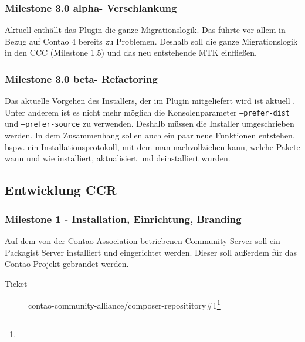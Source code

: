 \documentclass[
paper=a4,
draft=false,%
fontsize=10pt%
]{scrartcl}
\begin{document}
\subsubsection[Milestone 3.0 alpha - Verschlankung]{Milestone 3.0 alpha\footnotemark - Verschlankung}
\label{subsec:ccp-milestone-3.0-alpha}

Aktuell enthällt das Plugin die ganze Migrationslogik. Das führte vor allem in Bezug auf Contao 4 bereits zu Problemen. Deshalb soll die ganze Migrationslogik in den CCC (Milestone 1.5) und das neu entstehende MTK einfließen.

\subsubsection[Milestone 3.0 beta - Refactoring]{Milestone 3.0 beta\footnotemark - Refactoring}
\label{subsec:ccp-milestone-3.0-beta}

Das aktuelle Vorgehen des Installers, der im Plugin mitgeliefert wird ist aktuell . Unter anderem ist es nicht mehr möglich die Konsolenparameter \texttt{--prefer-dist} und \texttt{--prefer-source} zu verwenden. Deshalb müssen die Installer umgeschrieben werden. In dem Zusammenhang sollen auch ein paar neue Funktionen entstehen, bspw. ein Installationsprotokoll, mit dem man nachvollziehen kann, welche Pakete wann und wie installiert, aktualisiert und deinstalliert wurden.

\pagebreak

\subsection{Entwicklung CCR}
\label{subsec:ccr}

\subsubsection{Milestone 1 - Installation, Einrichtung, Branding}
\label{subsec:ccr-milestone-1}

Auf dem von der Contao Association betriebenen Community Server soll ein Packagist Server installiert und eingerichtet werden. Dieser soll außerdem für das Contao Projekt gebrandet werden.

\begin{description}
\item[Ticket] contao-community-alliance/composer-reposititory\#1\footnote{}
\end{description}
\end{document}
